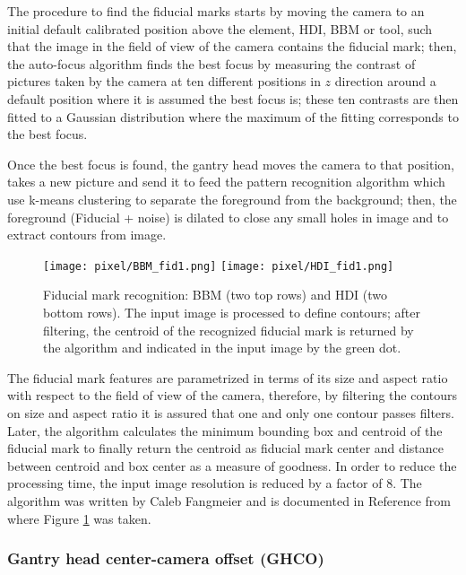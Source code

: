The procedure to find the fiducial marks starts by moving the camera to an initial default calibrated position above the element, HDI, BBM or tool, such that the image in the field of view of the camera contains the fiducial mark; then, the auto-focus algorithm finds the best focus by measuring the contrast of pictures taken by the camera at ten different positions in $z$ direction around a default position where it is assumed the best focus is; these ten contrasts are then fitted to a Gaussian distribution where the maximum of the fitting corresponds to the best focus.     

Once the best focus is found, the gantry head moves the camera to that position, takes a new picture and send it to feed the pattern recognition algorithm which use k-means clustering to separate the foreground from the background; then, the foreground (Fiducial + noise) is dilated to close any small holes in image and to extract contours from image.

\begin{figure}[!ht]
  \centering  
  \texttt{[image: pixel/BBM\_fid1.png]}
  \texttt{[image: pixel/HDI\_fid1.png]}
  \caption[Fiducial mark recognition.]{Fiducial mark recognition: BBM (two top rows) and HDI (two bottom rows). The input image is processed to define contours; after filtering, the centroid of the recognized fiducial mark is returned by the algorithm and indicated in the input image by the green dot.}\label{fig:BBM_fid1}
\end{figure}

The fiducial mark features are parametrized in terms of its size and aspect ratio with respect to the field of view of the camera, therefore, by filtering the contours on size and aspect ratio it is assured that one and only one contour passes filters. Later, the algorithm calculates the minimum bounding box and centroid of the fiducial mark to finally return the centroid as fiducial mark center and distance between centroid and box center as a measure of goodness. In order to reduce the processing time, the input image resolution is reduced by a factor of 8. The algorithm was written by Caleb Fangmeier and is documented in Reference \cite{pr_algorithm} from where Figure \ref{fig:BBM_fid1} was taken.

\subsubsection*{Gantry head center-camera offset (GHCO)}

